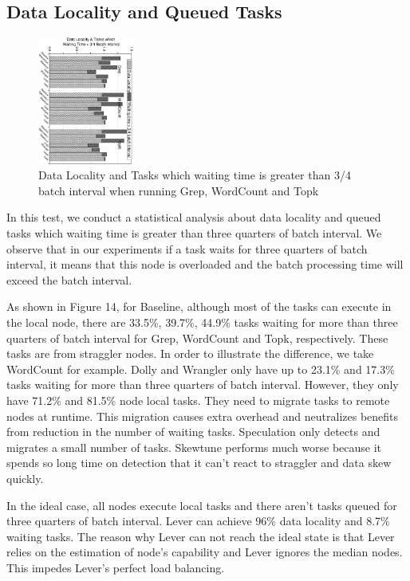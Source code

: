 \documentclass[10pt,conference,compsocconf,letterpaper]{IEEEtran}
\begin{document}
\subsection{Data Locality and Queued Tasks}

  \begin{figure}[htbp]
    \centering
    \includegraphics[width=0.28\textwidth, angle=90]{FigureDLWT}
    \caption{Data Locality and Tasks which waiting time is greater than 3/4 batch interval when running Grep, WordCount and Topk}
    \label{Fig. 14:}
  \end{figure}

  In this test, we conduct a statistical analysis about data locality and queued tasks which waiting time is greater than three quarters of batch interval. We observe that in our experiments if a task waits for three quarters of batch interval, it means that this node is overloaded and the batch processing time will exceed the batch interval.

  As shown in Figure 14, for Baseline, although most of the tasks can execute in the local node, there are 33.5\%, 39.7\%, 44.9\% tasks waiting for more than three quarters of batch interval for Grep, WordCount and Topk, respectively. These tasks are from straggler nodes. In order to illustrate the difference, we take WordCount for example. Dolly and Wrangler only have up to 23.1\% and 17.3\% tasks waiting for more than three quarters of batch interval. However, they only have 71.2\% and 81.5\% node local tasks. They need to migrate tasks to remote nodes at runtime. This migration causes extra overhead and neutralizes benefits from reduction in the number of waiting tasks. Speculation only detects and migrates a small number of tasks. Skewtune performs much worse because it spends so long time on detection that it can't react to straggler and data skew quickly.

  In the ideal case, all nodes execute local tasks and there aren't tasks queued for three quarters of batch interval. Lever can achieve 96\% data locality and 8.7\% waiting tasks. The reason why Lever can not reach the ideal state is that Lever relies on the estimation of node's capability and Lever ignores the median nodes. This impedes Lever's perfect load balancing.
\end{document}
